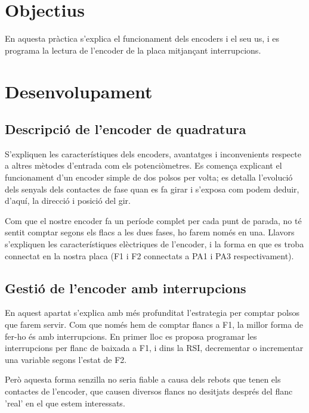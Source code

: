
\section{Objectius}

En aquesta pràctica s'explica el funcionament dels encoders i el seu us, i es programa
la lectura de l'encoder de la placa mitjançant interrupcions.

\section{Desenvolupament}


\subsection{Descripció de l'encoder de quadratura}

S'expliquen les característiques dels encoders, avantatges i inconvenients
respecte a altres mètodes d'entrada com els potenciòmetres. Es comença
explicant el funcionament d'un encoder simple de dos polsos per volta;
es detalla l'evolució dels senyals dels contactes de fase quan es fa girar
i s'exposa com podem deduir, d'aquí, la direcció i posició del gir.

Com que el nostre encoder fa un període complet per cada punt de parada,
no té sentit comptar segons els flacs a les dues fases, ho farem només en una.
Llavors s'expliquen les característiques elèctriques de l'encoder, i la forma en
que es troba connectat en la nostra placa (F1 i F2 connectats a PA1 i PA3
respectivament).


\subsection{Gestió de l'encoder amb interrupcions}

En aquest apartat s'explica amb més profunditat l'estrategia per comptar
polsos que farem servir. Com que només hem de comptar flancs a F1, la
millor forma de fer-ho és amb interrupcions. En primer lloc es proposa
programar les interrupcions per flanc de baixada a F1, i dins la RSI,
decrementar o incrementar una variable segons l'estat de F2.

Però aquesta forma senzilla no seria fiable a causa dels rebots que tenen
els contactes de l'encoder, que causen diversos flancs no desitjats després
del flanc 'real' en el que estem interessats.

